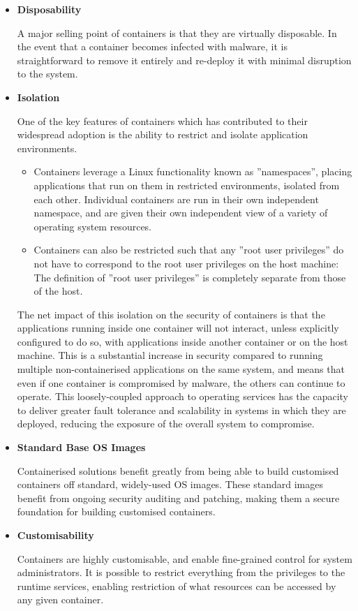 \begin{itemize}
\item \textbf{Disposability}

A major selling point of containers is that they are virtually disposable. In the event that a container becomes infected with malware, it is straightforward to remove it entirely and re-deploy it with minimal disruption to the system. 

\item \textbf{Isolation}

One of the key features of containers which has contributed to their widespread adoption is the ability to restrict and isolate application environments. 

	\begin{itemize}
    \item Containers leverage a Linux functionality known as ''namespaces'', placing applications that run on them in restricted environments, isolated from each other. Individual containers are run in their own independent namespace, and are given their own independent view of a  variety of operating system resources. 

	\item Containers can also be restricted such that any ''root user privileges'' do not have to correspond to the root user privileges on the host machine: The definition of ''root user privileges'' is completely separate from those of the host. 
    
    \end{itemize}
    The net impact of this isolation on the security of containers is that the applications running inside one container will not interact, unless explicitly configured to do so, with applications inside another container or on the host machine. This is a substantial increase in security compared to running multiple non-containerised applications on the same system, and means that even if one container is compromised by malware, the others can continue to operate. This loosely-coupled approach to operating services has the capacity to deliver greater fault tolerance and scalability in systems in which they are deployed, reducing the exposure of the overall system to compromise.
\item \textbf{Standard Base OS Images}

Containerised solutions benefit greatly from being able to build customised containers off standard, widely-used OS images. These standard images benefit from ongoing security auditing and patching, making them a secure foundation for building customised containers. 

\item \textbf{Customisability}

Containers are highly customisable, and enable fine-grained control for system administrators. It is possible to restrict everything from the privileges to the runtime services, enabling restriction of what resources can be accessed by any given container. 

\end{itemize}

